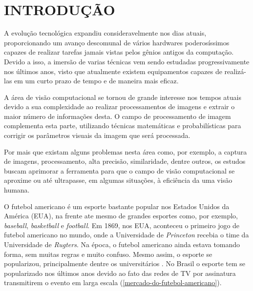\chapter{\textbf{INTRODUÇÃO}}
\label{cap-introducao}
A evolução tecnológica expandiu consideravelmente nos dias atuais, proporcionando um avanço descomunal de vários hardwares poderosíssimos capazes de realizar tarefas jamais vistas pelos gênios antigos da computação. Devido a isso, a imersão de varias técnicas vem sendo estudadas progressivamente nos últimos anos, visto que atualmente existem equipamentos capazes de realizá-las em um curto prazo de tempo e de maneira mais eficaz.

A área de visão computacional se tornou de grande interesse nos tempos atuais devido a sua complexidade ao realizar processamentos de imagens e extrair o maior número de informações desta. O campo de processamento de imagem complementa esta parte, utilizando técnicas matemáticas e probabilísticas para corrigir os parâmetros visuais da imagem que será processada.

Por mais que existam alguns problemas nesta área como, por exemplo, a captura de imagens, processamento, alta precisão, similaridade, dentre outros, os estudos buscam aprimorar a ferramenta para que o campo de visão computacional se aproxime ou até ultrapasse, em algumas situações, à eficiência da uma visão humana.

O futebol americano é um esporte bastante popular nos Estados Unidos da América (EUA), na frente ate mesmo de grandes esportes como, por exemplo, \textit{baseball}, \textit{basketball} e \textit{football}. Em 1869, nos EUA, aconteceu o primeiro jogo de futebol americano no mundo, onde a Universidade de \textit{Princeton} recebia o time da Universidade de \textit{Rugters}. Na época, o futebol americano ainda estava tomando forma, sem muitas regras e muito confuso. Mesmo assim, o esporte se popularizou, principalmente dentre os universitários \cite{RODRIGUES2014}. No Brasil o esporte tem se popularizado nos últimos anos devido ao fato das redes de TV por assinatura transmitirem o evento em larga escala (\autoref{mercado-do-futebol-americano}). 



